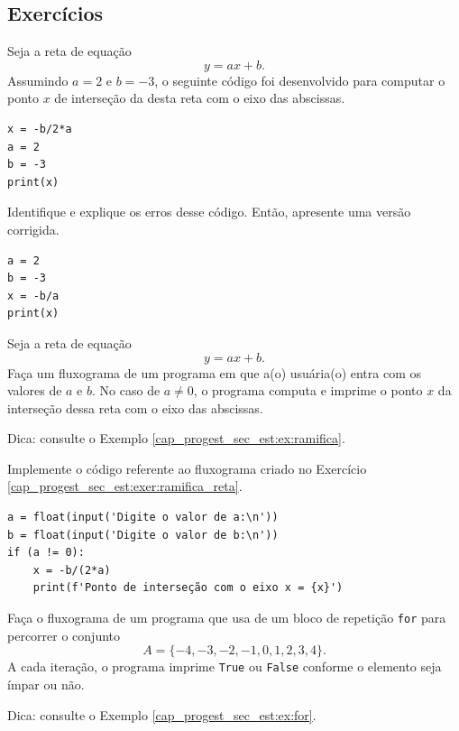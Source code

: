 \subsection{Exercícios}

\begin{exer}
  Seja a reta de equação
  \begin{equation}
    y = ax + b.
  \end{equation}
  Assumindo $a=2$ e $b=-3$, o seguinte código foi desenvolvido para computar o ponto $x$ de interseção da desta reta com o eixo das abscissas.
\begin{lstlisting}
x = -b/2*a
a = 2
b = -3
print(x)
\end{lstlisting}
  Identifique e explique os erros desse código. Então, apresente uma versão corrigida.
\end{exer}
\begin{resp}
\begin{lstlisting}
a = 2
b = -3
x = -b/a
print(x)
\end{lstlisting}
\end{resp}

\begin{exer}\label{cap_progest_sec_est:exer:ramifica_reta}
  Seja a reta de equação
  \begin{equation}
    y = ax + b.
  \end{equation}
  Faça um fluxograma de um programa em que a(o) usuária(o) entra com os valores de $a$ e $b$. No caso de $a\neq 0$, o programa computa e imprime o ponto $x$ da interseção dessa reta com o eixo das abscissas.
\end{exer}
\begin{resp}
  Dica: consulte o Exemplo \ref{cap_progest_sec_est:ex:ramifica}.
\end{resp}

\begin{exer}
  Implemente o código referente ao fluxograma criado no Exercício \ref{cap_progest_sec_est:exer:ramifica_reta}.
\end{exer}
\begin{resp}
\begin{lstlisting}
a = float(input('Digite o valor de a:\n'))
b = float(input('Digite o valor de b:\n'))
if (a != 0):
    x = -b/(2*a)
    print(f'Ponto de interseção com o eixo x = {x}')
\end{lstlisting}
\end{resp}

\begin{exer}\label{cap_progest_sec_est:exer:for}
  Faça o fluxograma de um programa que usa de um bloco de repetição \lstinline+for+ para percorrer o conjunto
  \begin{equation}
    A = \{-4, -3, -2, -1, 0, 1, 2, 3, 4\}.
  \end{equation}
  A cada iteração, o programa imprime \lstinline+True+ ou \lstinline+False+ conforme o elemento seja ímpar ou não.
\end{exer}
\begin{resp}
  Dica: consulte o Exemplo \ref{cap_progest_sec_est:ex:for}.
\end{resp}

